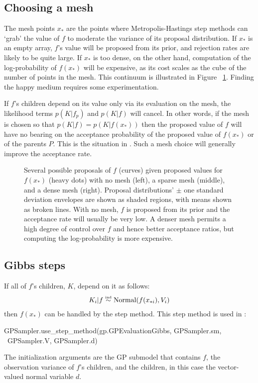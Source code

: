 \documentclass[article]{jss}
\begin{document}
\subsection{Choosing a mesh} 

The mesh points $x_*$ are the points where Metropolis-Hastings step methods can `grab' the value of $f$ to moderate the variance of its proposal distribution. If $x_*$ is an empty array, $f$'s value will be proposed from its prior, and rejection rates are likely to be quite large. If $x_*$ is too dense, on the other hand, computation of the log-probability of $f(x_*)$ will be expensive, as its cost scales as the cube of the number of points in the mesh. This continuum is illustrated in Figure~ \ref{fig:meshpropose}. Finding the happy medium requires some experimentation.

If $f$'s children depend on its value only via its evaluation on the mesh, the likelihood terms $p(K|f_p)$ and $p(K|f)$ will cancel. In other words, if the mesh is chosen so that $p(K|f)=p(K|f(x_*))$ then the proposed value of $f$ will have no bearing on the acceptance probability of the proposed value of $f(x_*)$ or of the parents $P$. This is the situation in . Such a mesh choice will generally improve the acceptance rate.

\begin{figure}
    \centering
    \caption{Several possible proposals of $f$ (curves) given proposed values for $f(x_*)$ (heavy dots) with no mesh (left), a sparse mesh (middle), and a dense mesh (right). Proposal distributions'  $\pm$ one standard deviation envelopes are shown as shaded regions, with means shown as broken lines. With no mesh, $f$ is proposed from its prior and the acceptance rate will usually be very low. A denser mesh permits a high degree of control over $f$ and hence better acceptance ratios, but computing the log-probability is more expensive.}
    \label{fig:meshpropose}
\end{figure}

\subsection{Gibbs steps} 
\label{sec:gp-gibbs} 
If all of $f$'s children, $K$, depend on it as follows:
\begin{eqnarray*}
    K_i|f \stackrel{\textup{\tiny ind}}{\sim} \textup{Normal}(f(x_{*i}),V_i)
\end{eqnarray*}
then $f(x_*)$ can be handled by the  step method. This step method is used in :
\begin{CodeChunk}
\begin{CodeInput}
GPSampler.use_step_method(gp.GPEvaluationGibbs, GPSampler.sm, \
    GPSampler.V, GPSampler.d)
\end{CodeInput}
\end{CodeChunk}
The initialization arguments are the GP submodel that contains $f$, the observation variance of $f$'s children, and the children, in this case the vector-valued normal variable $d$. 
\end{document}
